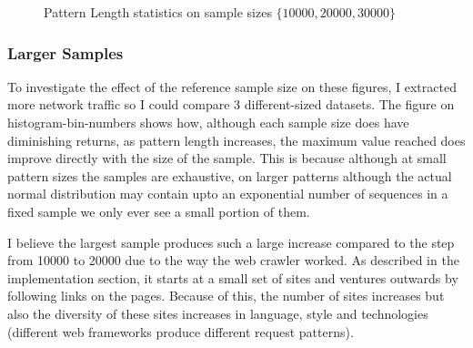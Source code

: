 \documentclass[ %
                    author={Samuel Russell},
                supervisor={Prof. Bogdan Warinschi},
                    degree={MEng},
                     title={Innocuous Ciphertexts},
                  subtitle={The DE-CENSOR Scheme},
                      type={research},
                      year={2018} ]{dissertation}
\begin{document}
\begin{figure}[h]
\begin{subfigure}[b]{.49\linewidth}
\end{subfigure}
\caption{Pattern Length statistics on sample sizes $\{10000, 20000, 30000\}$}
\end{figure}


\subsubsection{Larger Samples}

To investigate the effect of the reference sample size on these figures, I extracted more network traffic so I could compare 3 different-sized datasets.
The figure on histogram-bin-numbers shows how, although each sample size does have diminishing returns, as pattern length increases, the maximum value reached does improve directly with the size of the sample. This is because although at small pattern sizes the samples are exhaustive, on larger patterns although the actual normal distribution may contain upto an exponential number of sequences in a fixed sample we only ever see a small portion of them. 

I believe the largest sample produces such a large increase compared to the step from 10000 to 20000 due to the way the web crawler worked.
As described in the implementation section, it starts at a small set of sites and ventures outwards by following links on the pages.
Because of this, the number of sites increases but also the diversity of these sites increases in language, style and technologies (different web frameworks produce different request patterns).
\end{document}
